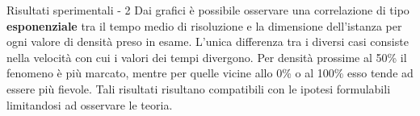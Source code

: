 \documentclass[a4paper]{beamer}
\begin{document}
\begin{frame}{Risultati sperimentali - 2}
Dai grafici è possibile osservare una correlazione di tipo \textbf{esponenziale} tra il tempo medio di risoluzione e la dimensione dell'istanza
per ogni valore di densità preso in esame.
\newline \newline
L'unica differenza tra i diversi casi consiste nella velocità con cui i valori dei tempi divergono. Per densità prossime al 50\% il fenomeno è più marcato, 
mentre per quelle vicine allo 0\% o al 100\% esso tende ad essere più fievole.
\newline \newline 
Tali risultati risultano compatibili con le ipotesi formulabili limitandosi ad osservare le teoria.
\end{frame}
\end{document}
